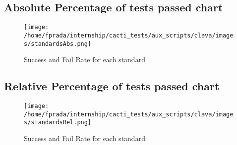 \documentclass{article}
\begin{document}
\subsection{Absolute Percentage of tests passed chart}
\begin{figure}[h!]
\centering
\texttt{[image: /home/fprada/internship/cacti\_tests/aux\_scripts/clava/images/standardsAbs.png]}
\caption{Success and Fail Rate for each standard}
\label{fig:standards}
\end{figure}
\subsection{Relative Percentage of tests passed chart}
\begin{figure}[h!]
\centering
\texttt{[image: /home/fprada/internship/cacti\_tests/aux\_scripts/clava/images/standardsRel.png]}
\caption{Success and Fail Rate for each standard}
\label{fig:standards}
\end{figure}
\end{document}
